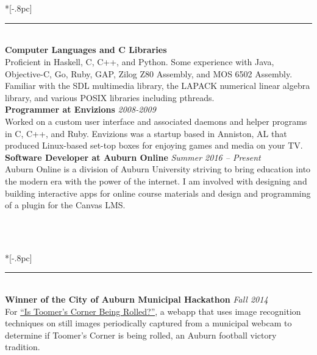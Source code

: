 \documentclass{article}
\begin{document}
\

 \\*[-.8pc]
\rule{\textwidth}{.1pt} \\
{\bf Computer Languages and C Libraries} \\
Proficient in Haskell, C, C++, and Python. Some experience with Java,
Objective-C, Go, Ruby, GAP, Zilog Z80 Assembly, and MOS 6502 Assembly. Familiar
with the SDL multimedia library, the LAPACK numerical linear algebra library,
and various POSIX libraries including pthreads. \\

\noindent \textbf{Programmer at Envizions} \hfill \textit{2008-2009}\\
Worked on a custom user interface and associated daemons and helper
programs in C, C++, and Ruby. Envizions was a startup based in Anniston, AL that
produced Linux-based set-top boxes for enjoying games and media on your TV.\\

\noindent \textbf{Software Developer at Auburn Online} \hfill \textit{Summer 2016 --
  Present}\\
Auburn Online is a division of Auburn University striving to bring education
into the modern era with the power of the internet. I am involved with designing
and building interactive apps for online course materials and design and
programming of a plugin for the Canvas LMS.

\

 \\*[-.8pc]
\rule{\textwidth}{.1pt} \\
{\bf Winner of the City of Auburn Municipal Hackathon} \hfill {\it Fall 2014}\\
For \href{https://github.com/IsToomersCornerBeingRolledRightNow}{``Is Toomer's
  Corner Being Rolled?''}, a webapp that uses image recognition techniques on
still images periodically captured from a municipal webcam to determine if
Toomer's Corner is being rolled, an Auburn football victory tradition.
\\ \\
\end{document}
